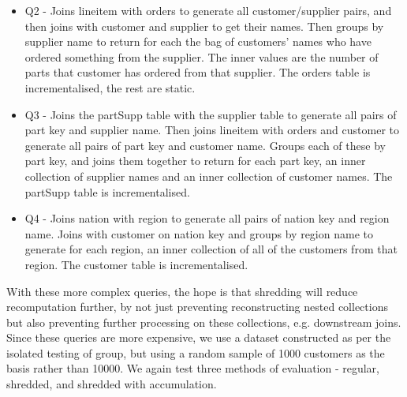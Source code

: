 \begin{itemize}
\item{Q2 - Joins lineitem with orders to generate all customer/supplier pairs, and then joins with customer and supplier to get their names. Then groups by supplier name to return for each the bag of customers' names who have ordered something from the supplier. The inner values are the number of parts that customer has ordered from that supplier. The orders table is incrementalised, the rest are static.}
\item{Q3 - Joins the partSupp table with the supplier table to generate all pairs of part key and supplier name. Then joins lineitem with orders and customer to generate all pairs of part key and customer name. Groups each of these by part key, and joins them together to return for each part key, an inner collection of supplier names and an inner collection of customer names. The partSupp table is incrementalised.}
\item{Q4 - Joins nation with region to generate all pairs of nation key and region name. Joins with customer on nation key and groups by region name to generate for each region, an inner collection of all of the customers from that region. The customer table is incrementalised.} 
\end{itemize}

With these more complex queries, the hope is that shredding will reduce recomputation further, by not just preventing reconstructing nested collections but also preventing further processing on these collections, e.g. downstream joins. Since these queries are more expensive, we use a dataset constructed as per the isolated testing of group, but using a random sample of 1000 customers as the basis rather than 10000. We again test three methods of evaluation - regular, shredded, and shredded with accumulation.

